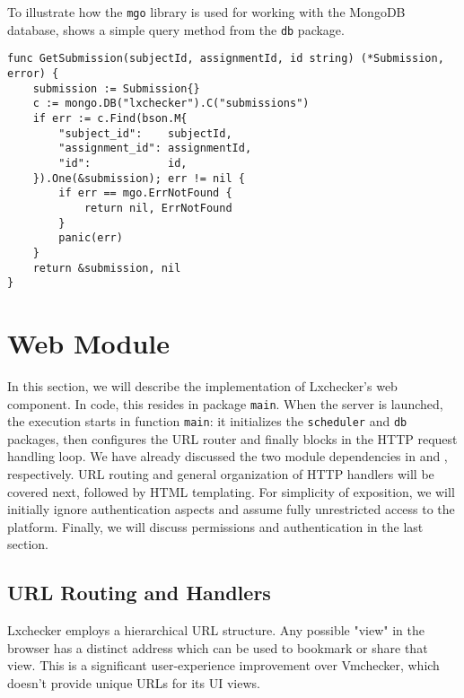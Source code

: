 To illustrate how the \texttt{mgo} library is used for working with the MongoDB database,  shows a simple query method from the \texttt{db} package.

\lstset{language=Golang,caption=GetSubmission query method,label=lst:get-submission}
\begin{lstlisting}
func GetSubmission(subjectId, assignmentId, id string) (*Submission, error) {
	submission := Submission{}
	c := mongo.DB("lxchecker").C("submissions")
	if err := c.Find(bson.M{
		"subject_id":    subjectId,
		"assignment_id": assignmentId,
		"id":            id,
	}).One(&submission); err != nil {
		if err == mgo.ErrNotFound {
			return nil, ErrNotFound
		}
		panic(err)
	}
	return &submission, nil
}
\end{lstlisting}


\section{Web Module}
\label{sec:web-module}

In this section, we will describe the implementation of Lxchecker's web component. In code, this resides in package \texttt{main}. When the server is launched, the execution starts in function \texttt{main}: it initializes the \texttt{scheduler} and \texttt{db} packages, then configures the URL router and finally blocks in the HTTP request handling loop. We have already discussed the two module dependencies in  and , respectively. URL routing and general organization of HTTP handlers will be covered next, followed by HTML templating. For simplicity of exposition, we will initially ignore authentication aspects and assume fully unrestricted access to the platform. Finally, we will discuss permissions and authentication in the last section.

\subsection{URL Routing and Handlers}
\label{sub-sec:handlers}

Lxchecker employs a hierarchical URL structure. Any possible "view" in the browser has a distinct address which can be used to bookmark or share that view. This is a significant user-experience improvement over Vmchecker, which doesn't provide unique URLs for its UI views.


